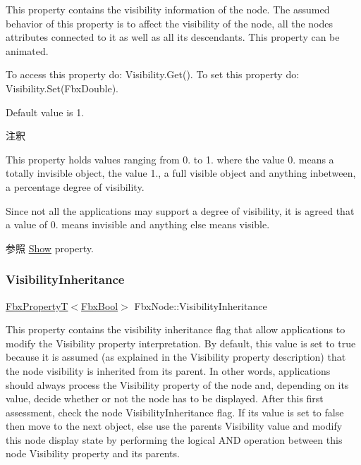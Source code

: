 This property contains the visibility information of the node. The assumed behavior of this property is to affect the visibility of the node, all the nodes attributes connected to it as well as all its descendants. This property can be animated.

To access this property do\+: Visibility.\+Get(). To set this property do\+: Visibility.\+Set(\+Fbx\+Double).

Default value is 1. \begin{DoxyRemark}{注釈}
\begin{DoxyItemize}
\item This property holds values ranging from 0. to 1. where the value 0. means a totally invisible object, the value 1., a full visible object and anything inbetween, a percentage degree of visibility.~\newline
 \item Since not all the applications may support a degree of visibility, it is agreed that a value of 0. means invisible and anything else means visible.\end{DoxyItemize}

\end{DoxyRemark}
\begin{DoxySeeAlso}{参照}
\hyperlink{class_fbx_node_a685ccf0b6e1bc5070c28d9e7a8823c74}{Show} property. 
\end{DoxySeeAlso}
\mbox{\label{class_fbx_node_a30e99c3f4d79c72bca148ea4b250f6db}} 
\subsubsection{\texorpdfstring{Visibility\+Inheritance}{VisibilityInheritance}}
{\footnotesize\ttfamily \hyperlink{class_fbx_property_t}{Fbx\+PropertyT}$<$\hyperlink{fbxtypes_8h_a92e0562b2fe33e76a242f498b362262e}{Fbx\+Bool}$>$ Fbx\+Node\+::\+Visibility\+Inheritance}

This property contains the visibility inheritance flag that allow applications to modify the Visibility property interpretation. By default, this value is set to {\ttfamily true} because it is assumed (as explained in the Visibility property description) that the node visibility is inherited from its parent. In other words, applications should always process the Visibility property of the node and, depending on its value, decide whether or not the node has to be displayed. After this first assessment, check the node Visibility\+Inheritance flag. If its value is set to {\ttfamily false} then move to the next object, else use the parent\textquotesingle{}s Visibility value and modify this node display state by performing the logical A\+ND operation between this node Visibility property and its parent\textquotesingle{}s.

